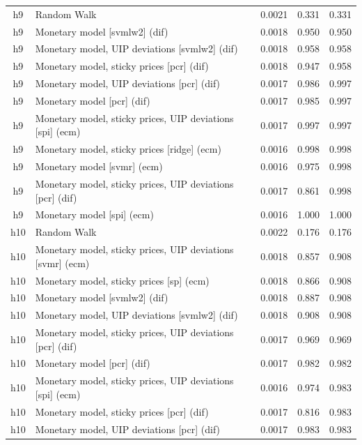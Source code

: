 \begin{ThreePartTable}
\begin{longtable}[t]{cp{5.5cm}ccc}
\addlinespace
h9 & \raggedright Random Walk & 0.0021 & 0.331 & 0.331\\
h9 & \raggedright Monetary model [svmlw2] (dif) & 0.0018 & 0.950 & 0.950\\
h9 & \raggedright Monetary model, UIP deviations [svmlw2] (dif) & 0.0018 & 0.958 & 0.958\\
h9 & \raggedright Monetary model, sticky prices [pcr] (dif) & 0.0018 & 0.947 & 0.958\\
h9 & \raggedright Monetary model, UIP deviations [pcr] (dif) & 0.0017 & 0.986 & 0.997\\
h9 & \raggedright Monetary model [pcr] (dif) & 0.0017 & 0.985 & 0.997\\
h9 & \raggedright Monetary model, sticky prices, UIP deviations [spi] (ecm) & 0.0017 & 0.997 & 0.997\\
h9 & \raggedright Monetary model, sticky prices [ridge] (ecm) & 0.0016 & 0.998 & 0.998\\
h9 & \raggedright Monetary model [svmr] (ecm) & 0.0016 & 0.975 & 0.998\\
h9 & \raggedright Monetary model, sticky prices, UIP deviations [pcr] (dif) & 0.0017 & 0.861 & 0.998\\
h9 & \raggedright Monetary model [spi] (ecm) & 0.0016 & 1.000 & 1.000\\
\addlinespace
h10 & \raggedright Random Walk & 0.0022 & 0.176 & 0.176\\
h10 & \raggedright Monetary model, sticky prices, UIP deviations [svmr] (ecm) & 0.0018 & 0.857 & 0.908\\
h10 & \raggedright Monetary model, sticky prices [sp] (ecm) & 0.0018 & 0.866 & 0.908\\
h10 & \raggedright Monetary model [svmlw2] (dif) & 0.0018 & 0.887 & 0.908\\
h10 & \raggedright Monetary model, UIP deviations [svmlw2] (dif) & 0.0018 & 0.908 & 0.908\\
h10 & \raggedright Monetary model, sticky prices, UIP deviations [pcr] (dif) & 0.0017 & 0.969 & 0.969\\
h10 & \raggedright Monetary model [pcr] (dif) & 0.0017 & 0.982 & 0.982\\
h10 & \raggedright Monetary model, sticky prices, UIP deviations [spi] (ecm) & 0.0016 & 0.974 & 0.983\\
h10 & \raggedright Monetary model, sticky prices [pcr] (dif) & 0.0017 & 0.816 & 0.983\\
h10 & \raggedright Monetary model, UIP deviations [pcr] (dif) & 0.0017 & 0.983 & 0.983\\

\end{longtable}
\end{ThreePartTable}
